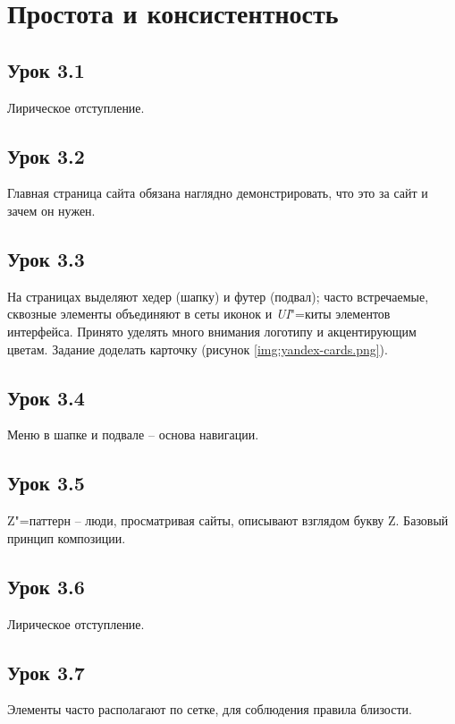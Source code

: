 \documentclass[variant=practice]{bsuir}
\begin{document}

\section{Простота и консистентность}

\subsection{Урок 3.1} Лирическое отступление.

\subsection{Урок 3.2} Главная страница сайта обязана наглядно демонстрировать,
что это за сайт и зачем он нужен.

\subsection{Урок 3.3} На страницах выделяют хедер (шапку) и футер (подвал);
часто встречаемые, сквозные элементы объединяют в сеты иконок и
\textit{UI}"=киты элементов интерфейса. Принято уделять много внимания логотипу
и акцентирующим цветам. Задание доделать карточку (рисунок
\ref{img:yandex-cards.png}).

\subsection{Урок 3.4} Меню в шапке и подвале -- основа навигации.

\subsection{Урок 3.5} Z"=паттерн -- люди, просматривая сайты, описывают взглядом
букву Z. Базовый принцип композиции.


\subsection{Урок 3.6} Лирическое отступление.

\subsection{Урок 3.7} Элементы часто располагают по сетке, для соблюдения
правила близости.
\end{document}
